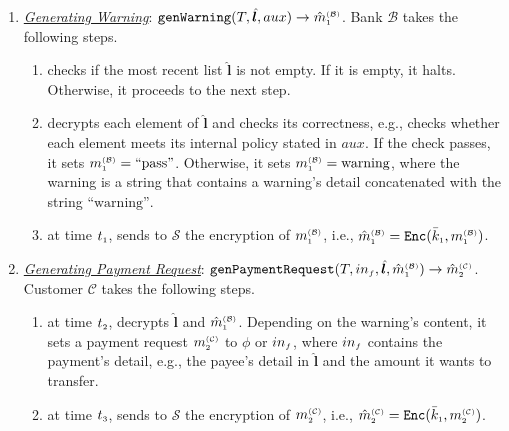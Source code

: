 \begin{enumerate}[leftmargin=.46cm]
 



\item\label{Generating-Warning} \underline{\textit{Generating Warning}}: $\mathtt{genWarning}(T, {\hat{\bm l}}, aux)\rightarrow \hat m^{\scriptscriptstyle\mathcal{(B)}}_{\scriptscriptstyle1}$.
%
Bank $\mathcal{B}$ takes the following steps. 
\begin{enumerate}
%
\item  checks if the most recent list $\hat{\bm{l}}$ is not empty. If it is empty, it halts. Otherwise, it proceeds to the next step. 
%
\item  decrypts each element of $\hat{\bm l}$ and checks its correctness, e.g., checks whether each element meets its internal policy  stated in $aux$. If the check passes, it sets $m_{\scriptscriptstyle 1}^{\scriptscriptstyle(\mathcal{B})}= \text{``pass''}$. Otherwise, it sets $m_{\scriptscriptstyle 1}^{\scriptscriptstyle(\mathcal{B})}=\text{warning}$, where the warning is a  string that contains a warning's detail concatenated with the string $\text{``warning''}$.
%
\item at time $t_{\scriptscriptstyle 1}$, sends to $\mathcal{S}$ the encryption of $m_{\scriptscriptstyle 1}^{\scriptscriptstyle(\mathcal{B})}$, i.e.,  $\hat m_{\scriptscriptstyle 1}^{\scriptscriptstyle(\mathcal{B})}= \mathtt{Enc}(\bar k_{\scriptscriptstyle 1}, m_{\scriptscriptstyle 1}^{\scriptscriptstyle(\mathcal B)})$. 
\end{enumerate}



\item\label{clinet-at-T2} \underline{\textit{Generating Payment Request}}: $\mathtt{genPaymentRequest}(T, in_{\scriptscriptstyle f}, \hat{\bm{l}}, \hat m^{\scriptscriptstyle\mathcal{(B)}}_{\scriptscriptstyle1})\rightarrow \hat m^{\scriptscriptstyle\mathcal{(C)}}_{\scriptscriptstyle2}$.
%
Customer $\mathcal{C}$ takes the following steps. 
\begin{enumerate}
%
\item\label{decrypt-warning} at time $t_{\scriptscriptstyle 2}$, decrypts  $\hat{\bm{l}}$ and $\hat m_{\scriptscriptstyle 1}^{\scriptscriptstyle(\mathcal{B})}$.  Depending on the warning's content, it sets a payment request $m_{\scriptscriptstyle 2}^{\scriptscriptstyle(\mathcal C)}$ to  $\phi$ or  $in_{\scriptscriptstyle f}$, where $in_{\scriptscriptstyle f}$ contains the payment's detail, e.g., the payee's detail in $\hat {\bm l}$ and the amount it wants to transfer. 
%
\item\label{send-payment-req} at time $t_{\scriptscriptstyle 3}$, sends  to $\mathcal{S}$ the encryption of $m_{\scriptscriptstyle 2}^{\scriptscriptstyle(\mathcal C)}$, i.e., $\hat m_{\scriptscriptstyle 2}^{\scriptscriptstyle(\mathcal{C})}= \mathtt{Enc}(\bar k_{\scriptscriptstyle 1}, m_{\scriptscriptstyle 2}^{\scriptscriptstyle(\mathcal C)})$.
\end{enumerate}
%


\end{enumerate}
